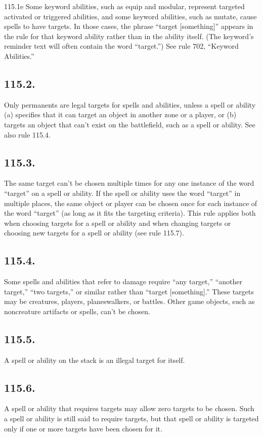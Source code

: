 115.1e Some keyword abilities, such as equip and modular, represent targeted activated or triggered abilities, and some keyword abilities, such as mutate, cause spells to have targets. In those cases, the phrase “target [something]” appears in the rule for that keyword ability rather than in the ability itself. (The keyword’s reminder text will often contain the word “target.”) See rule 702, “Keyword Abilities.”

\subsection*{115.2.}
Only permanents are legal targets for spells and abilities, unless a spell or ability (a) specifies that it can target an object in another zone or a player, or (b) targets an object that can’t exist on the battlefield, such as a spell or ability. See also rule 115.4.

\subsection*{115.3.}
The same target can’t be chosen multiple times for any one instance of the word “target” on a spell or ability. If the spell or ability uses the word “target” in multiple places, the same object or player can be chosen once for each instance of the word “target” (as long as it fits the targeting criteria). This rule applies both when choosing targets for a spell or ability and when changing targets or choosing new targets for a spell or ability (see rule 115.7).

\subsection*{115.4.}
Some spells and abilities that refer to damage require “any target,” “another target,” “two targets,” or similar rather than “target [something].” These targets may be creatures, players, planeswalkers, or battles. Other game objects, such as noncreature artifacts or spells, can’t be chosen.

\subsection*{115.5.}
A spell or ability on the stack is an illegal target for itself.

\subsection*{115.6.}
A spell or ability that requires targets may allow zero targets to be chosen. Such a spell or ability is still said to require targets, but that spell or ability is targeted only if one or more targets have been chosen for it.

